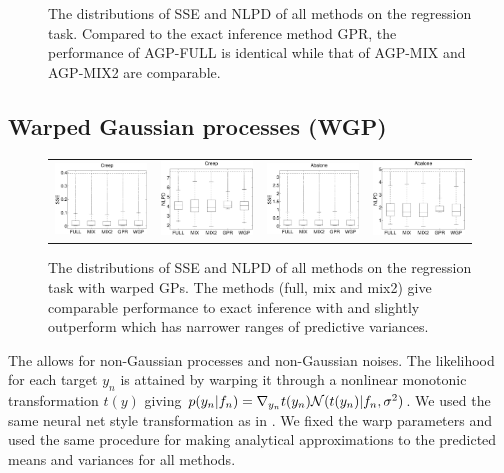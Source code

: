 \begin{figure}
\begin{tabular}{cc}
\end{tabular}
\caption{The distributions of SSE and NLPD of all methods on the regression task. Compared to the exact inference method GPR, the performance of AGP-FULL is identical while that of AGP-MIX and AGP-MIX2 are comparable.}
\label{fig:regression}
\end{figure}

\subsection{Warped Gaussian processes (WGP)}
\begin{figure}
\setlength{\tabcolsep}{0pt}
\begin{tabular}{cccc}
\includegraphics[width=0.25\linewidth]{figures/creep-smse.eps} &
\includegraphics[width=0.24\linewidth]{figures/creep-nlpd.eps} &
\includegraphics[width=0.25\linewidth]{figures/abalone-smse.eps} &
\includegraphics[width=0.24\linewidth]{figures/abalone-nlpd.eps} 
\end{tabular}
\caption{The distributions of SSE and NLPD of all methods on the regression task with warped GPs. 
The \agp \space methods ({\sc full}, {\sc mix} and {\sc mix2}) give comparable performance
to  exact inference with \wgp \space and slightly outperform \gpr \space which has  narrower ranges of predictive variances.}
\label{fig:warp}
\end{figure}
%
The \wgp \space allows for non-Gaussian processes and non-Gaussian noises.
The likelihood for each target $y_n$ is attained by warping it through a nonlinear monotonic transformation $t(y)$ giving $p(y_n | f_n) = \nabla_{y_n} t(y_n) \mathcal{N}(t(y_n) | f_n, \sigma^2)$.
We used the same neural net style transformation %
as in \cite{snelson2003warped}.
We fixed the warp parameters and used the same procedure for making analytical approximations to the predicted means and variances for all methods.

